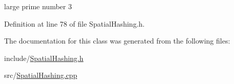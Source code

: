 large prime number 3 



Definition at line 78 of file SpatialHashing.h.



The documentation for this class was generated from the following files:\begin{DoxyCompactItemize}
\item 
include/\hyperlink{_spatial_hashing_8h}{SpatialHashing.h}\item 
src/\hyperlink{_spatial_hashing_8cpp}{SpatialHashing.cpp}\end{DoxyCompactItemize}
